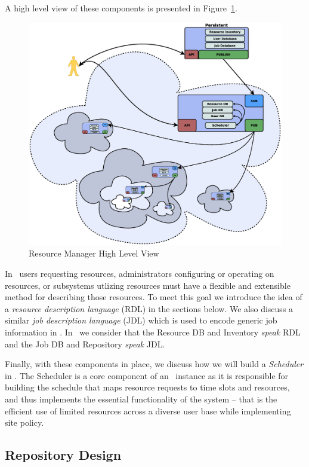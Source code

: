 A high level view of these components is presented in Figure~\ref{RMComponents}.

\begin{figure}
\centering
\includegraphics[scale=0.20]{../fig/RM-full.eps}
\caption{Resource Manager High Level View}
\label{RMComponents}
\end{figure}

In \ngrm\ users requesting resources, administrators configuring
or operating on resources, or subsystems utlizing resources
must have a flexible and extensible method for describing those
resources.  To meet this goal we introduce the idea of a {\em
resource description language} (RDL) in the sections below. We
also discuss a similar {\em job description language} (JDL) which
is used to encode generic job information in \ngrm. In \ngrm\
we consider that the Resource DB and Inventory {\em speak} RDL
and the Job DB and Repository {\em speak} JDL.

Finally, with these components in place, we discuss how we will
build a {\em Scheduler} in \ngrm. The Scheduler is a core component
of an \ngrm\ instance as it is responsible for building the schedule
that maps resource requests to time slots and resources, and thus
implements the essential functionality of the system -- that is the
efficient use of limited resources across a diverse user base while
implementing site policy.

\subsection{Repository Design}

